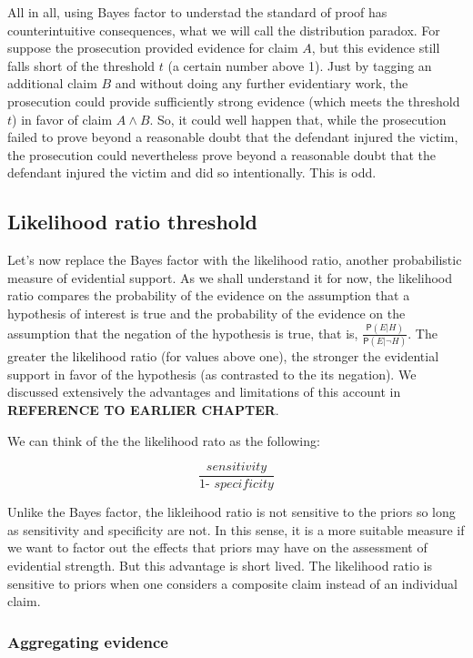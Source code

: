 \documentclass[10pt,dvipsnames,enabledeprecatedfontcommands]{scrartcl}
\newcommand{\pr}[1]{\mathsf{P}(#1)}
\begin{document}
All in all, using Bayes factor to understad the standard of proof has
counterintuitive consequences, what we will call the distribution
paradox. For suppose the prosecution provided evidence for claim \(A\),
but this evidence still falls short of the threshold \(t\) (a certain
number above 1). Just by tagging an additional claim \(B\) and without
doing any further evidentiary work, the prosecution could provide
sufficiently strong evidence (which meets the threshold \(t\)) in favor
of claim \(A \wedge B\). So, it could well happen that, while the
prosecution failed to prove beyond a reasonable doubt that the defendant
injured the victim, the prosecution could nevertheless prove beyond a
reasonable doubt that the defendant injured the victim and did so
intentionally. This is odd.

\subsection{Likelihood ratio
threshold}\label{likelihood-ratio-threshold}

Let's now replace the Bayes factor with the likelihood ratio, another
probabilistic measure of evidential support. As we shall understand it
for now, the likelihood ratio compares the probability of the evidence
on the assumption that a hypothesis of interest is true and the
probability of the evidence on the assumption that the negation of the
hypothesis is true, that is,
\(\frac{\pr{E \vert H}}{\pr{E \vert \neg H}}\). The greater the
likelihood ratio (for values above one), the stronger the evidential
support in favor of the hypothesis (as contrasted to the its negation).
We discussed extensively the advantages and limitations of this account
in \textbf{REFERENCE TO EARLIER CHAPTER}.

We can think of the the likelihood rato as the following:

\[\frac{\textit{sensitivity}}{\textit{1- specificity}}\]

\noindent
Unlike the Bayes factor, the likleihood ratio is not sensitive to the
priors so long as sensitivity and specificity are not. In this sense, it
is a more suitable measure if we want to factor out the effects that
priors may have on the assessment of evidential strength. But this
advantage is short lived. The likelihood ratio is sensitive to priors
when one considers a composite claim instead of an individual claim.

\subsubsection{Aggregating evidence}\label{aggregating-evidence-1}
\end{document}

